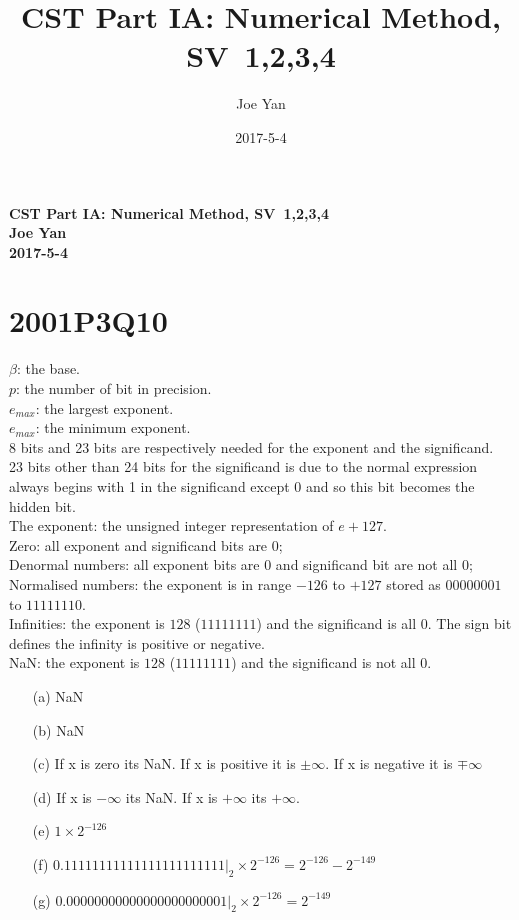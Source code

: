 \documentclass[10pt,twoside,a4paper]{article}
\newcommand{\studentname}{Joe Yan}
\newcommand{\svworkdate}{2017-5-4}
\newcommand{\svcourse}{CST Part IA: Numerical Method}
\newcommand{\svnumber}{1,2,3,4}
\begin{document}
\author{\studentname}
\title{\svcourse, SV~\svnumber}
\date{\svworkdate}

\textbf{\svcourse, SV~\svnumber}\\
\textbf{\studentname}\\
\textbf{\svworkdate}\\

\section*{2001P3Q10}
$\beta$: the base.
\\$p$: the number of bit in precision.
\\$e_{max}$: the largest exponent.
\\$e_{max}$: the minimum exponent.
\\8 bits and 23 bits are respectively needed for the exponent and the significand.
\\23 bits other than 24 bits for the significand is due to the normal expression always begins with 1 in the significand except 0 and so this bit becomes the hidden bit.
\\The exponent: the unsigned integer representation of $e+127$.
\\Zero: all exponent and significand bits are 0;
\\Denormal numbers: all exponent bits are 0 and significand bit are not all 0;
\\Normalised numbers: the exponent is in range $-126$ to $+127$ stored as $00000001$ to $11111110$.
\\Infinities: the exponent is $128$ ($11111111$)  and the significand is all 0. The sign bit defines the infinity is positive or negative.
\\NaN: the exponent is $128$ ($11111111$)  and the significand is not all 0.
\begin{itemize}
\item[(a)]
NaN
\item[(b)]
NaN
\item[(c)]
If x is zero its NaN.
If x is positive it is $\pm\infty$.
If x is negative it is $\mp\infty$
\item[(d)]
If x is $-\infty$ its NaN.
If x is $+\infty$ its $+\infty$.
\item[(e)]
$1\times 2^{-126}$
\item[(f)]
$0.11111111111111111111111|_2\times 2^{-126}=2^{-126}-2^{-149}$
\item[(g)]
$0.00000000000000000000001|_2\times 2^{-126} = 2^{-149}$
\end{itemize}
\end{document}
